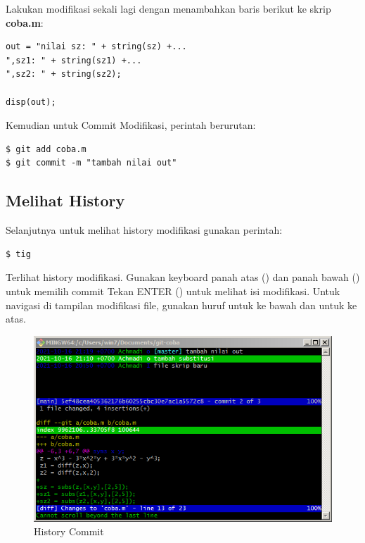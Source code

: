 \documentclass[12pt]{book}
\begin{document}
	Lakukan modifikasi sekali lagi dengan menambahkan baris berikut ke skrip \textbf{coba.m}:
	\begin{verbatim}
out = "nilai sz: " + string(sz) +...
",sz1: " + string(sz1) +...
",sz2: " + string(sz2);

disp(out);
	\end{verbatim}

	Kemudian untuk Commit Modifikasi, perintah berurutan:
	\begin{verbatim}
$ git add coba.m
$ git commit -m "tambah nilai out"
	\end{verbatim}

	\newpage
	\subsection{Melihat History}

	Selanjutnya untuk melihat history modifikasi gunakan perintah:
	\begin{verbatim}
$ tig
	\end{verbatim}

	Terlihat history modifikasi.
	Gunakan keyboard panah atas (\keys{$\uparrow$}) dan panah bawah (\keys{$\downarrow$}) untuk memilih commit
	Tekan ENTER (\keys{\return}) untuk melihat isi modifikasi.
	Untuk navigasi di tampilan modifikasi file, gunakan huruf  untuk ke bawah dan  untuk ke atas.

	\begin{figure}[!ht]
		\centering
		\includegraphics[width=400pt]{images/git10}
		\caption{History Commit}
	\end{figure}
\end{document}
